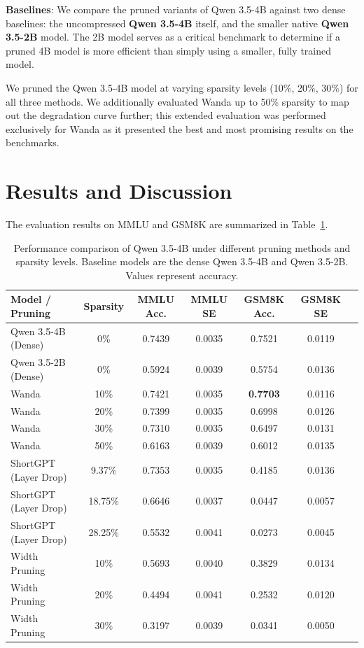 \documentclass[11pt,a4paper,twocolumn]{article}
\begin{document}
\textbf{Baselines}: We compare the pruned variants of Qwen 3.5-4B against two dense baselines: the uncompressed \textbf{Qwen 3.5-4B} itself, and the smaller native \textbf{Qwen 3.5-2B} model. The 2B model serves as a critical benchmark to determine if a pruned 4B model is more efficient than simply using a smaller, fully trained model. 

We pruned the Qwen 3.5-4B model at varying sparsity levels (10\%, 20\%, 30\%) for all three methods. We additionally evaluated Wanda up to 50\% sparsity to map out the degradation curve further; this extended evaluation was performed exclusively for Wanda as it presented the best and most promising results on the benchmarks.

\section{Results and Discussion}

The evaluation results on MMLU and GSM8K are summarized in Table~\ref{tab:results}. 

\begin{table}[t]
\centering
\caption{Performance comparison of Qwen 3.5-4B under different pruning methods and sparsity levels. Baseline models are the dense Qwen 3.5-4B and Qwen 3.5-2B. Values represent accuracy.}
\label{tab:results}
\begin{tabular}{lcccccc}
\toprule
\textbf{Model / Pruning} & \textbf{Sparsity} & \textbf{MMLU Acc.} & \textbf{MMLU SE} & \textbf{GSM8K Acc.} & \textbf{GSM8K SE} \\
\midrule
Qwen 3.5-4B (Dense) & 0\% & 0.7439 & 0.0035 & 0.7521 & 0.0119 \\
Qwen 3.5-2B (Dense) & 0\% & 0.5924 & 0.0039 & 0.5754 & 0.0136 \\
\midrule
Wanda & 10\% & 0.7421 & 0.0035 & \textbf{0.7703} & 0.0116 \\
Wanda & 20\% & 0.7399 & 0.0035 & 0.6998 & 0.0126 \\
Wanda & 30\% & 0.7310 & 0.0035 & 0.6497 & 0.0131 \\
Wanda & 50\% & 0.6163 & 0.0039 & 0.6012 & 0.0135 \\
\midrule
ShortGPT (Layer Drop) & 9.37\% & 0.7353 & 0.0035 & 0.4185 & 0.0136 \\
ShortGPT (Layer Drop) & 18.75\% & 0.6646 & 0.0037 & 0.0447 & 0.0057 \\
ShortGPT (Layer Drop) & 28.25\% & 0.5532 & 0.0041 & 0.0273 & 0.0045 \\
\midrule
Width Pruning & 10\% & 0.5693 & 0.0040 & 0.3829 & 0.0134 \\
Width Pruning & 20\% & 0.4494 & 0.0041 & 0.2532 & 0.0120 \\
Width Pruning & 30\% & 0.3197 & 0.0039 & 0.0341 & 0.0050 \\
\bottomrule
\end{tabular}
\end{table}
\end{document}
